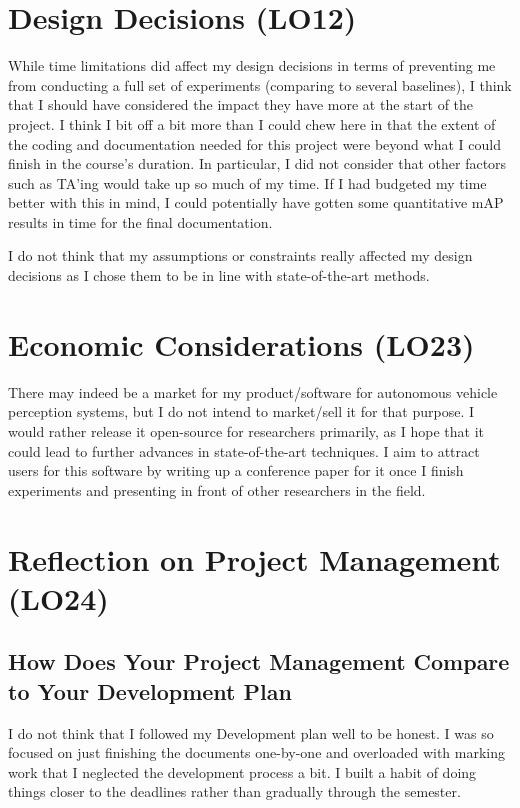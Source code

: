 \documentclass{article}
\begin{document}
\section{Design Decisions (LO12)}

While time limitations did affect my design decisions in terms of preventing me from conducting a full set of experiments (comparing to several baselines), I 
think that I should have considered the impact they have more at the start of the project. I think I bit off a bit more than I could 
chew here in that the extent of the coding and documentation needed for this project were beyond what I could finish in the course's duration. 
In particular, I did not consider that other factors such as TA'ing would take up so much of my time. If I had budgeted my time better with this 
in mind, I could potentially have gotten some quantitative mAP results in time for the final documentation.

I do not think that my assumptions or constraints really affected my design decisions as I chose them to be in line with 
state-of-the-art methods.

\section{Economic Considerations (LO23)}

There may indeed be a market for my product/software for autonomous vehicle perception 
systems, but I do not intend to market/sell it for that purpose. I would rather release it 
open-source for researchers primarily, as I hope that it could lead to further advances in 
state-of-the-art techniques. I aim to attract users for this software by writing up a conference 
paper for it once I finish experiments and presenting in front of other researchers in the field.

\section{Reflection on Project Management (LO24)}

\subsection{How Does Your Project Management Compare to Your Development Plan}

I do not think that I followed my Development plan well to be honest. I was so focused on just finishing the documents one-by-one and overloaded with marking work that I neglected the development process a bit. I built a habit of doing things closer to the deadlines rather than gradually through the semester.
\end{document}
